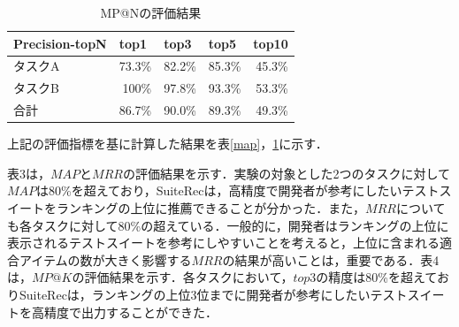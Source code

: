 \documentclass[12pt]{jarticle} %
\begin{document}

\begin{table}[h]
\caption{MP@Nの評価結果}
\label{pre}
\begin{center}
\begin{tabular}{|p{3cm}|p{2cm}|p{2cm}|p{2cm}|p{2cm}|}
\hline \hline
Precision-topN & top1 & top3 & top5 & top10 \\ \hline
タスクA & \multicolumn{1}{r|}{73.3\%} & \multicolumn{1}{r|}{82.2\%} & \multicolumn{1}{r|}{85.3\%} & \multicolumn{1}{r|}{45.3\%} \\ \hline
タスクB & \multicolumn{1}{r|}{100\%} & \multicolumn{1}{r|}{97.8\%} & \multicolumn{1}{r|}{93.3\%} & \multicolumn{1}{r|}{53.3\%} \\ \hline
合計 & \multicolumn{1}{r|}{86.7\%} & \multicolumn{1}{r|}{90.0\%} & \multicolumn{1}{r|}{89.3\%} & \multicolumn{1}{r|}{49.3\%} \\ \hline
\end{tabular}
\end{center}
\end{table}


上記の評価指標を基に計算した結果を表\ref{map}，\ref{pre}に示す．

表3は，$MAP$と$MRR$の評価結果を示す．実験の対象とした2つのタスクに対して$MAP$は80\%を超えており，{\sf SuiteRec}は，高精度で開発者が参考にしたいテストスイートをランキングの上位に推薦できることが分かった．また，$MRR$についても各タスクに対して80\%の超えている．一般的に，開発者はランキングの上位に表示されるテストスイートを参考にしやすいことを考えると，上位に含まれる適合アイテムの数が大きく影響する$MRR$の結果が高いことは，重要である．表4は，$MP@K$の評価結果を示す．各タスクにおいて，$top3$の精度は$80$\%を超えており{\sf SuiteRec}は，ランキングの上位$3$位までに開発者が参考にしたいテストスイートを高精度で出力することができた．
\end{document}
